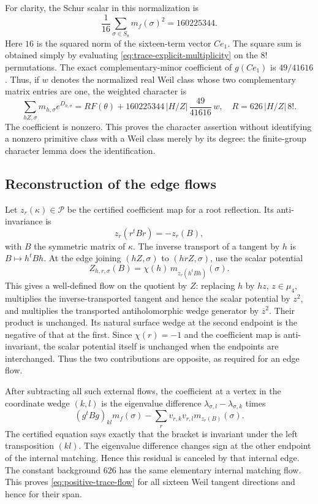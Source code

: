 For clarity, the Schur scalar in this normalization is
\[
 \frac1{16}\sum_{\sigma\in S_8}m_f(\sigma)^2
 =160225344.
\]
Here \(16\) is the squared norm of the sixteen-term vector
\(Ce_1\).  The square sum is obtained simply by evaluating
\eqref{eq:trace-explicit-multiplicity} on the \(8!\) permutations.
The exact complementary-minor coefficient of \(g(Ce_1)\) is
\(49/41616\).  Thus, if \(w\) denotes the normalized real Weil
class whose two complementary matrix entries are one, the weighted
character is
\begin{equation}
 \sum_{hZ,\sigma}m_{h,\sigma}e^{D_{h,\sigma}}
 =R F(\theta)+
  160225344\,|H/Z|\,\frac{49}{41616}\,w,
 \quad R=626\,|H/Z|\,8!.
 \label{eq:trace-positive-character}
\end{equation}
The coefficient is nonzero.  This proves the character assertion
without identifying a nonzero primitive class with a Weil class
merely by its degree: the finite-group character lemma does the
identification.

\subsection{Reconstruction of the edge flows}

Let \(z_r(\kappa)\in\mathcal P\) be the certified coefficient
map for a root reflection.  Its anti-invariance is
\[
 z_r(r^tBr)=-z_r(B),
\]
with \(B\) the symmetric matrix of \(\kappa\).  The inverse
transport of a tangent by \(h\) is \(B\mapsto h^tBh\).
At the edge joining \((hZ,\sigma)\) to \((hrZ,\sigma)\),
use the scalar potential
\[
 Z_{h,r,\sigma}(B)=
  \chi(h)\,m_{z_r(h^tBh)}(\sigma).
\]
This gives a well-defined flow on the quotient by \(Z\): replacing
\(h\) by \(hz\), \(z\in\mu_4\), multiplies the inverse-transported
tangent and hence the scalar potential by \(z^2\), and multiplies
the transported antiholomorphic wedge generator by \(\overline z^2\).
Their product is unchanged.
Its natural surface wedge at the second endpoint is the negative
of that at the first.  Since \(\chi(r)=-1\) and the coefficient
map is anti-invariant, the scalar potential itself is unchanged
when the endpoints are interchanged.  Thus the two contributions
are opposite, as required for an edge flow.

After subtracting all such external flows, the coefficient at a
vertex in the coordinate wedge \((k,l)\) is the eigenvalue
difference \(\lambda_{\sigma,l}-\lambda_{\sigma,k}\) times
\[
 (g^tBg)_{kl}m_f(\sigma)
   -\sum_r v_{r,k}v_{r,l}m_{z_r(B)}(\sigma).
\]
The certified equation says exactly that the bracket is invariant
under the left transposition \((kl)\).  The eigenvalue difference
changes sign at the other endpoint of the internal matching.
Hence this residual is canceled by that internal edge.  The
constant background \(626\) has the same elementary internal
matching flow.  This proves \eqref{eq:positive-trace-flow} for all
sixteen Weil tangent directions and hence for their span.

